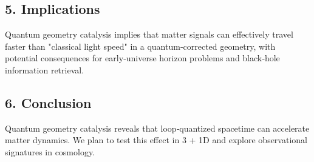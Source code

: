 \documentclass[12pt]{article}
\begin{document}
\subsection*{5. Implications}
Quantum geometry catalysis implies that matter signals can effectively travel faster than "classical light speed" in a quantum‐corrected geometry, with potential consequences for early‐universe horizon problems and black‐hole information retrieval.

\subsection*{6. Conclusion}
Quantum geometry catalysis reveals that loop‐quantized spacetime can accelerate matter dynamics.  We plan to test this effect in 3 + 1D and explore observational signatures in cosmology.
\end{document}
